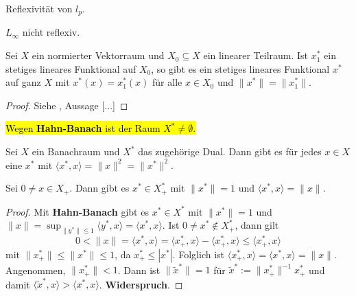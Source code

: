 \begin{bsp}
Reflexivität von $l_p$.
\end{bsp}

\begin{bsp}
$L_\infty$ nicht reflexiv.
\end{bsp}

\begin{fsatz}
Sei $X$ ein normierter Vektorraum und $X_0\subseteq X$ ein linearer Teilraum. Ist $x_1^*$ ein stetiges lineares Funktional auf $X_0$, so gibt es ein stetiges lineares Funktional $x^*$ auf ganz $X$ mit $x^*(x)=x_1^*(x)$ für alle $x\in X_0$ und $\|x^*\|=\|x_1^*\|$.
\end{fsatz}

\begin{proof}
Siehe \cite{werner_2007}, Aussage [...]
\end{proof}

\begin{bem}
\hl{Wegen \textbf{Hahn-Banach} ist der Raum $X^*\neq\emptyset$.}
\end{bem}


\begin{lem}
Sei $X$ ein Banachraum und $X^*$ das zugehörige Dual. Dann gibt es für jedes $x\in X$ eine $x^*$ mit $\langle x^*, x\rangle=\|x\|^2 = \|x^*\|^2$.
\end{lem}

\begin{lem}\label{Lemma nach Hahn-Banach}
Sei $0\neq x\in X_+$. Dann gibt es $x^*\in X^*_+$ mit $\|x^*\|= 1$ und $\langle x^*, x\rangle = \|x\|$.
\end{lem}

\begin{proof}
Mit \textbf{Hahn-Banach} gibt es  $x^*\in X^*$ mit $\|x^*\| =1$ und  $\|x\| = \sup_{\|y^*\|\leq 1}\langle y^*, x\rangle = \langle x^*, x\rangle$. Ist $0\neq x^*\not\in X_+^*$, dann gilt
\begin{equation*}
0 < \|x\|=\langle x^*, x\rangle = \langle x_+^*, x\rangle - \langle x_+^*, x\rangle\leq \langle x_+^*, x\rangle
\end{equation*}
mit $\|x_+^*\|\leq \|x^*\|\leq 1$, da $x_+^*\leq |x^*|$. Folglich ist $\langle x_+^*, x\rangle = \langle x^*, x \rangle = \|x\|$. Angenommen,  $\|x^*_+\| < 1$. Dann ist $\|\widetilde{x}^*\|=1$ für $\widetilde{x}^*:= \|x_+^*\|^{-1} x_+^*$  und damit $\langle \widetilde{x}^*, x\rangle> \langle x^*, x\rangle$. \textbf{Widerspruch}. 
\end{proof}


